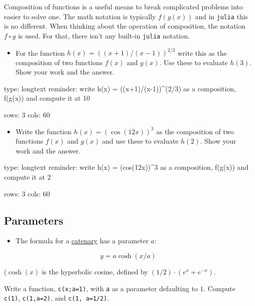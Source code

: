 \documentclass[12pt]{article}
\begin{document}
Composition of functions is a useful means to break complicated problems
into easier to solve one. The math notation is typically $f(g(x))$ and
in \texttt{julia} this is no different. When thinking about the
operation of composition, the notation $f \circ g$ is used. For that,
there isn't any built-in \texttt{julia} notation.

\begin{itemize}
\itemsep1pt\parskip0pt
\item
  For the function $h(x) = ((x+1)/(x-1))^{2/3}$ write this as the
  composition of two functions $f(x)$ and $g(x)$. Use these to evaluate
  $h(3)$. Show your work and the answer.
\end{itemize}

\begin{answer}
type: longtext
reminder: write h(x) = ((x+1)/(x-1))^(2/3) as a composition, f(g(x)) and compute it at 10

rows: 3
cols: 60
\end{answer}

\begin{itemize}
\itemsep1pt\parskip0pt
\item
  Write the function $h(x) = (\cos(12x))^3$ as the composition of two
  functions $f(x)$ and $g(x)$ and use these to evaluate $h(2)$. Show
  your work and the answer.
\end{itemize}

\begin{answer}
type: longtext
reminder: write h(x) =  (cos(12x))^3 as a composition, f(g(x)) and compute it at 2

rows: 3
cols: 60
\end{answer}

\subsection{Parameters}

\begin{itemize}
\itemsep1pt\parskip0pt
\item
  The formula for a
  \href{http://en.wikipedia.org/wiki/Catenary}{catenary} has a parameter
  $a$:
\end{itemize}

\[
y = a \cosh(x/a)
\]

($\cosh(x)$ is the hyperbolic cosine, defined by
$(1/2) \cdot (e^x + e^{-x})$.

Write a function, \texttt{c(x;a=1)}, with \texttt{a} as a parameter
defaulting to $1$. Compute \texttt{c(1)}, \texttt{c(1,a=2)}, and
\texttt{c(1, a=1/2)}.
\end{document}
